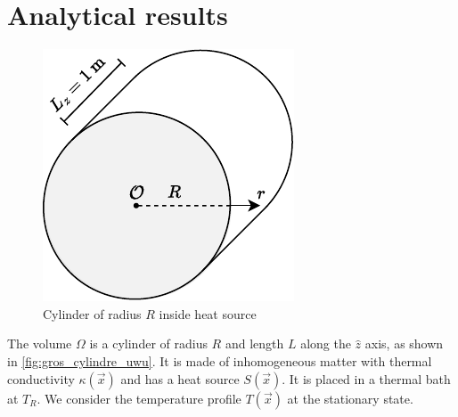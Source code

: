\section{Analytical results}

\begin{figure}
    \vspace*{-1cm}
    \centering
    \includegraphics[width=\linewidth]{figures/cylindre.pdf}
    \caption{Cylinder of radius \(R\) inside heat source}
    \label{fig:gros_cylindre_uwu}
    \vspace*{1cm}
\end{figure}
The volume $\Omega$ is a cylinder of radius $R$ and length $L$ along the $\hat{z}$ axis, as shown in \autoref{fig:gros_cylindre_uwu}. It is made of inhomogeneous matter with thermal conductivity $\kappa(\vec{x})$ and has a heat source $S(\vec{x})$. It is placed in a thermal bath at $T_R$. We consider the temperature profile $T(\vec{x})$ at the stationary state.

